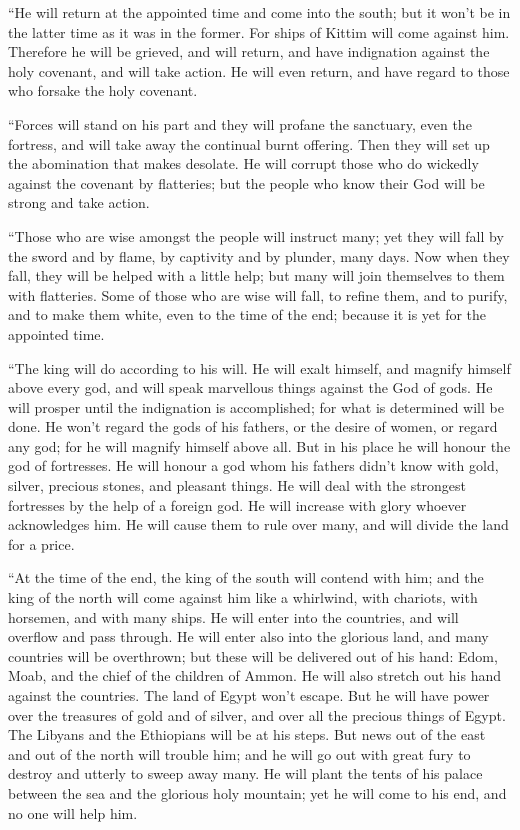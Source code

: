  ``He will return at the appointed time and come into the
south; but it won't be in the latter time as it was in the former.
 For ships of Kittim will come against him. Therefore he
will be grieved, and will return, and have indignation against the holy
covenant, and will take action. He will even return, and have regard to
those who forsake the holy covenant.

 ``Forces will stand on his part and they will profane the
sanctuary, even the fortress, and will take away the continual burnt
offering. Then they will set up the abomination that makes desolate.
 He will corrupt those who do wickedly against the covenant
by flatteries; but the people who know their God will be strong and take
action.

 ``Those who are wise amongst the people will instruct
many; yet they will fall by the sword and by flame, by captivity and by
plunder, many days.  Now when they fall, they will be
helped with a little help; but many will join themselves to them with
flatteries.  Some of those who are wise will fall, to
refine them, and to purify, and to make them white, even to the time of
the end; because it is yet for the appointed time.

 ``The king will do according to his will. He will exalt
himself, and magnify himself above every god, and will speak marvellous
things against the God of gods. He will prosper until the indignation is
accomplished; for what is determined will be done.  He
won't regard the gods of his fathers, or the desire of women, or regard
any god; for he will magnify himself above all.  But in his
place he will honour the god of fortresses. He will honour a god whom
his fathers didn't know with gold, silver, precious stones, and pleasant
things.  He will deal with the strongest fortresses by the
help of a foreign god. He will increase with glory whoever acknowledges
him. He will cause them to rule over many, and will divide the land for
a price.

 ``At the time of the end, the king of the south will
contend with him; and the king of the north will come against him like a
whirlwind, with chariots, with horsemen, and with many ships. He will
enter into the countries, and will overflow and pass through.
 He will enter also into the glorious land, and many
countries will be overthrown; but these will be delivered out of his
hand: Edom, Moab, and the chief of the children of Ammon. 
He will also stretch out his hand against the countries. The land of
Egypt won't escape.  But he will have power over the
treasures of gold and of silver, and over all the precious things of
Egypt. The Libyans and the Ethiopians will be at his steps.
 But news out of the east and out of the north will trouble
him; and he will go out with great fury to destroy and utterly to sweep
away many.  He will plant the tents of his palace between
the sea and the glorious holy mountain; yet he will come to his end, and
no one will help him.

